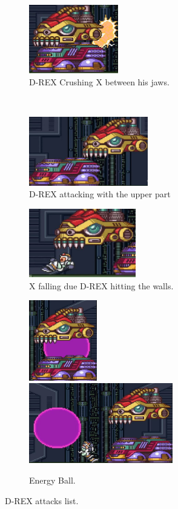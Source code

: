 \begin{figure}[htp]
	\centering
	\begin{subfigure}[t]{0.40\linewidth}
		\centering
		\includegraphics[height=3cm]{figures/X1/Sigma_stages/Drex_crush.jpg}
		\caption{D-REX Crushing X between his jaws.}
	\end{subfigure}\\
	\begin{subfigure}[t]{0.49\linewidth}
		\centering
		\includegraphics[height=3cm]{figures/X1/Sigma_stages/Drex_press.jpg}
		\caption{D-REX attacking with the upper part}
	\end{subfigure}
	\begin{subfigure}[t]{0.49\linewidth}
		\centering
		\includegraphics[height=3cm]{figures/X1/Sigma_stages/Drex_trip.jpg}
		\caption{X falling due D-REX hitting the walls.}
	\end{subfigure}
	\begin{subfigure}{\linewidth}
		\centering
		\includegraphics[height=3.5cm]{figures/X1/Sigma_stages/Drex_laser_1.jpg}
		\includegraphics[height=3.5cm]{figures/X1/Sigma_stages/Drex_laser_2.jpg}
		\caption{Energy Ball.}
	\end{subfigure}
	\caption{D-REX attacks list.}
\end{figure} 


